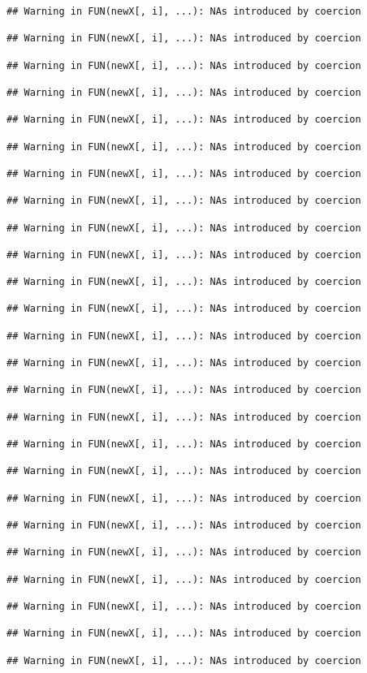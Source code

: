 \documentclass[]{article}
\begin{document}
\begin{verbatim}
## Warning in FUN(newX[, i], ...): NAs introduced by coercion

## Warning in FUN(newX[, i], ...): NAs introduced by coercion

## Warning in FUN(newX[, i], ...): NAs introduced by coercion

## Warning in FUN(newX[, i], ...): NAs introduced by coercion

## Warning in FUN(newX[, i], ...): NAs introduced by coercion

## Warning in FUN(newX[, i], ...): NAs introduced by coercion

## Warning in FUN(newX[, i], ...): NAs introduced by coercion

## Warning in FUN(newX[, i], ...): NAs introduced by coercion

## Warning in FUN(newX[, i], ...): NAs introduced by coercion

## Warning in FUN(newX[, i], ...): NAs introduced by coercion

## Warning in FUN(newX[, i], ...): NAs introduced by coercion

## Warning in FUN(newX[, i], ...): NAs introduced by coercion

## Warning in FUN(newX[, i], ...): NAs introduced by coercion

## Warning in FUN(newX[, i], ...): NAs introduced by coercion

## Warning in FUN(newX[, i], ...): NAs introduced by coercion

## Warning in FUN(newX[, i], ...): NAs introduced by coercion

## Warning in FUN(newX[, i], ...): NAs introduced by coercion

## Warning in FUN(newX[, i], ...): NAs introduced by coercion

## Warning in FUN(newX[, i], ...): NAs introduced by coercion

## Warning in FUN(newX[, i], ...): NAs introduced by coercion

## Warning in FUN(newX[, i], ...): NAs introduced by coercion

## Warning in FUN(newX[, i], ...): NAs introduced by coercion

## Warning in FUN(newX[, i], ...): NAs introduced by coercion

## Warning in FUN(newX[, i], ...): NAs introduced by coercion

## Warning in FUN(newX[, i], ...): NAs introduced by coercion


\end{verbatim}
\end{document}
